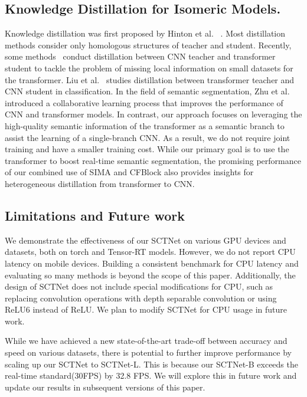 \documentclass[letterpaper]{article} %
\begin{document}
\subsection{Knowledge Distillation for Isomeric Models.} 
Knowledge distillation was first proposed by Hinton et al. ~\cite{hinton2015distilling}. Most distillation methods consider only homologous structures of teacher and student. Recently, some methods~\cite{touvron2021training,li2022locality} conduct distillation between CNN teacher and transformer student to tackle the problem of missing local information on small datasets for the transformer. Liu et al.~\cite{liu2022cross} studies distillation between transformer teacher and CNN student in classification. In the field of semantic segmentation, Zhu et al.~\cite{zhu2023good} introduced a collaborative learning process that improves the performance of CNN and transformer models. In contrast, our approach focuses on leveraging the high-quality semantic information of the transformer as a semantic branch to assist the learning of a single-branch CNN. As a result, we do not require joint training and have a smaller training cost. While our primary goal is to use the transformer to boost real-time semantic segmentation, the promising performance of our combined use of SIMA and CFBlock also provides insights for heterogeneous distillation from transformer to CNN.


\subsection{Limitations and Future work}
We demonstrate the effectiveness of our SCTNet on various GPU devices and datasets, both on torch and Tensor-RT models. However, we do not report CPU latency on mobile devices. Building a consistent benchmark for CPU latency and evaluating so many methods is beyond the scope of this paper. Additionally, the design of SCTNet does not include special modifications for CPU, such as replacing convolution operations with depth separable convolution or using ReLU6 instead of ReLU. We plan to modify SCTNet for CPU usage in future work.

While we have achieved a new state-of-the-art trade-off between accuracy and speed on various datasets, there is potential to further improve performance by scaling up our SCTNet to SCTNet-L. This is because our SCTNet-B exceeds the real-time standard(30FPS) by 32.8 FPS. We will explore this in future work and update our results in subsequent versions of this paper.
\end{document}

